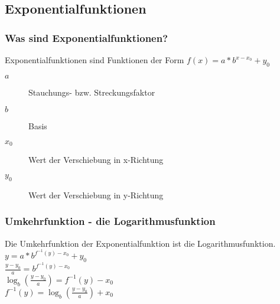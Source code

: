 \subsection{Exponentialfunktionen}
\subsubsection{Was sind Exponentialfunktionen?}
Exponentialfunktionen sind Funktionen der Form $f(x)=a*b^{x-x_0}+y_0$
\begin{description}
\item[$a$] Stauchungs- bzw. Streckungsfaktor
\item[$b$] Basis
\item[$x_0$] Wert der Verschiebung in x-Richtung
\item[$y_0$] Wert der Verschiebung in y-Richtung
\end{description}

\subsubsection{Umkehrfunktion - die Logarithmusfunktion}
Die Umkehrfunktion der Exponentialfunktion ist die Logarithmusfunktion.\\
$y = a*b^{f^{-1}(y) - x_0}+y_0$\\
$\frac{y-y_0}{a}=b^{f^{-1}(y) - x_0}$\\
$\log_b(\frac{y-y_0}{a})=f^{-1}(y) - x_0$\\
$f^{-1}(y) = \log_b(\frac{y-y_0}{a}) + x_0$